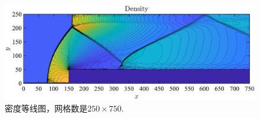 \documentclass[12pt]{article}
\begin{document}
\begin{figure}[htp]
	\centering
	\includegraphics[width=15cm]{density250.eps}
	\caption{密度等线图，网格数是$250\times 750$.}
	\label{fig:density250}
\end{figure}





\end{document}
